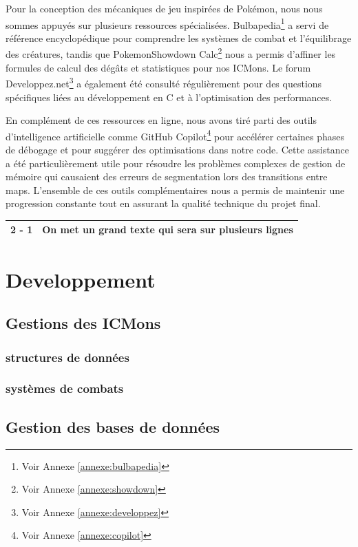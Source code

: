 \documentclass[12pt,a4paper, twoside]{article}
\begin{document}
Pour la conception des mécaniques de jeu inspirées de Pokémon, nous nous sommes appuyés sur plusieurs ressources spécialisées. Bulbapedia\footnote{Voir Annexe \ref{annexe:bulbapedia}} a servi de référence encyclopédique pour comprendre les systèmes de combat et l'équilibrage des créatures, tandis que PokemonShowdown Calc\footnote{Voir Annexe \ref{annexe:showdown}} nous a permis d'affiner les formules de calcul des dégâts et statistiques pour nos ICMons. Le forum Developpez.net\footnote{Voir Annexe \ref{annexe:developpez}} a également été consulté régulièrement pour des questions spécifiques liées au développement en C et à l'optimisation des performances.

En complément de ces ressources en ligne, nous avons tiré parti des outils d'intelligence artificielle comme GitHub Copilot\footnote{Voir Annexe \ref{annexe:copilot}} pour accélérer certaines phases de débogage et pour suggérer des optimisations dans notre code. Cette assistance a été particulièrement utile pour résoudre les problèmes complexes de gestion de mémoire qui causaient des erreurs de segmentation lors des transitions entre maps. L'ensemble de ces outils complémentaires nous a permis de maintenir une progression constante tout en assurant la qualité technique du projet final.
\newpage
\newpage
\begin{center}
\begin{tabular}{|c|p{8cm}|}
\hline
2 - 1 & On met un grand texte qui sera sur plusieurs lignes \\
\hline
\end{tabular}
\end{center}

\section{Developpement}
\subsection{Gestions des ICMons}
    \subsubsection{structures de données}
    \subsubsection{systèmes de combats}
\newpage
\subsection{Gestion des bases de données}
\end{document}
